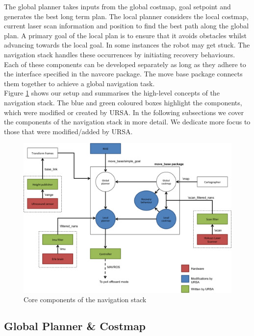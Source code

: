 \documentclass[capstone_report.tex]{subfiles}
\begin{document}
The global planner takes inputs from the global costmap, goal setpoint and generates the best long term plan.  The local planner considers the local costmap, current laser scan information and position to find the best path along the global plan.  A primary goal of the local plan is to ensure that it avoids obstacles whilst advancing towards the local goal.  In some instances the robot may get stuck.  The navigation stack handles these occurrences by initiating recovery behaviours.\\

Each of these components can be developed separately as long as they adhere to the interface specified in the navcore package.  The move base package connects them together to achieve a global navigation task.\\

Figure \ref{fig:nav_stack} shows our setup and summarises the high-level concepts of the navigation stack.  The blue and green coloured boxes highlight the components, which were modified or created by URSA.  In the following subsections we cover the components of the navigation stack in more detail.  We dedicate more focus to those that were modified/added by URSA.

\begin{figure}[H]
    \centering
    \includegraphics[width=1\textwidth]{imgs/navigation_stack.png}
    \caption{Core components of the navigation stack\label{fig:nav_stack}}
\end{figure}

\subsection{Global Planner \& Costmap}
\end{document}
